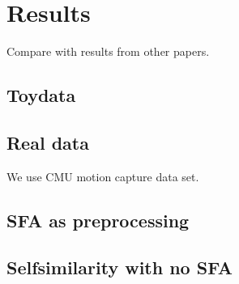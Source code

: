 \section{Results}
Compare with results from other papers. 
\subsection{Toydata}
\subsection{Real data}
We use CMU motion capture data set.
\subsection{SFA as preprocessing}
\subsection{Selfsimilarity with no SFA}
